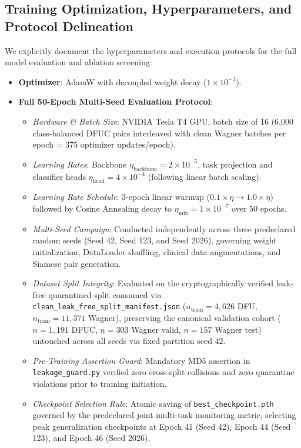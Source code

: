 \documentclass[journal]{IEEEtran}
\begin{document}
\subsection{Training Optimization, Hyperparameters, and Protocol Delineation}
We explicitly document the hyperparameters and execution protocols for the full model evaluation and ablation screening:
\begin{itemize}
    \item \textbf{Optimizer}: AdamW with decoupled weight decay ($1 \times 10^{-3}$).
    \item \textbf{Full 50-Epoch Multi-Seed Evaluation Protocol}:
    \begin{itemize}
        \item \textit{Hardware \& Batch Size}: NVIDIA Tesla T4 GPU, batch size of 16 (6,000 class-balanced DFUC pairs interleaved with clean Wagner batches per epoch = 375 optimizer updates/epoch).
        \item \textit{Learning Rates}: Backbone $\eta_{\text{backbone}} = 2 \times 10^{-5}$, task projection and classifier heads $\eta_{\text{head}} = 4 \times 10^{-4}$ (following linear batch scaling).
        \item \textit{Learning Rate Schedule}: 3-epoch linear warmup ($0.1 \times \eta \to 1.0 \times \eta$) followed by Cosine Annealing decay to $\eta_{\min} = 1 \times 10^{-7}$ over 50 epochs.
        \item \textit{Multi-Seed Campaign}: Conducted independently across three predeclared random seeds (Seed 42, Seed 123, and Seed 2026), governing weight initialization, DataLoader shuffling, clinical data augmentations, and Siamese pair generation.
        \item \textit{Dataset Split Integrity}: Evaluated on the cryptographically verified leak-free quarantined split consumed via \texttt{clean\_leak\_free\_split\_manifest.json} ($n_{\text{train}}=4,626$ DFU, $n_{\text{train}}=11,371$ Wagner), preserving the canonical validation cohort ($n=1,191$ DFUC, $n=303$ Wagner valid, $n=157$ Wagner test) untouched across all seeds via fixed partition seed 42.
        \item \textit{Pre-Training Assertion Guard}: Mandatory MD5 assertion in \texttt{leakage\_guard.py} verified zero cross-split collisions and zero quarantine violations prior to training initiation.
        \item \textit{Checkpoint Selection Rule}: Atomic saving of \texttt{best\_checkpoint.pth} governed by the predeclared joint multi-task monitoring metric, selecting peak generalization checkpoints at Epoch 41 (Seed 42), Epoch 44 (Seed 123), and Epoch 46 (Seed 2026).

\end{itemize}
\end{itemize}
\end{document}
